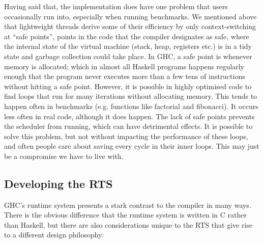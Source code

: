 \documentclass{article}
\begin{document}
Having said that, the implementation does have one problem that users
occasionally run into, especially when running benchmarks.  We
mentioned above that lightweight threads derive some of their
efficiency by only context-switching at ``safe points'', points in the
code that the compiler designates as safe, where the internal state of
the virtual machine (stack, heap, registers etc.) is in a tidy state
and garbage collection could take place.  In GHC, a safe point is
whenever memory is allocated; which in almost all Haskell programs
happens regularly enough that the program never executes more than a
few tens of instructions without hitting a safe point.  However, it is
possible in highly optimised code to find loops that run for many
iterations without allocating memory.  This tends to happen often in
benchmarks (e.g. functions like factorial and fibonacci).  It occurs
less often in real code, although it does happen.  The lack of safe
points prevents the scheduler from running, which can have detrimental
effects.  It is possible to solve this problem, but not without
impacting the performance of these loops, and often people care about
saving every cycle in their inner loops.  This may just be a
compromise we have to live with.


\subsection{Developing the RTS}

GHC's runtime system presents a stark contrast to
the compiler in many ways.  There is the obvious difference that the
runtime system is written in C rather than Haskell, but there are also
considerations unique to the RTS that give rise to a different design
philosophy:
\end{document}

